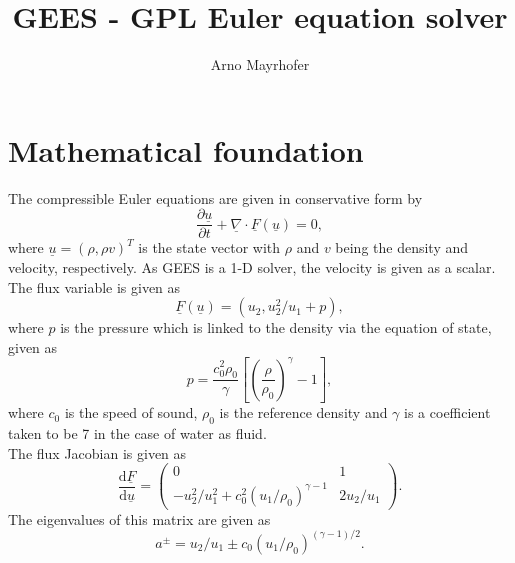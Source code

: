 \documentclass[a4paper]{article}
\newcommand{\uvec}[1]{\underline{#1}}
\newcommand{\unabla}{\uvec{\nabla}}
\newcommand{\td}{\mbox{d}}
\begin{document}
\title{GEES - GPL Euler equation solver}
\author{Arno Mayrhofer}

\maketitle

\section{Mathematical foundation}
The compressible Euler equations are given in conservative form by
\begin{equation}
\frac{\partial \uvec{u}}{\partial t} + \unabla \cdot \uvec{F}(\uvec{u}) = 0,
\label{e:euler}
\end{equation}
where $\uvec{u} = (\rho, \rho v)^T$ is the state vector with $\rho$ and $v$ being the density and velocity, respectively. As GEES is a 1-D solver, the velocity is given as a scalar. The flux variable is given as
\begin{equation}
\uvec{F}(\uvec{u}) = (u_2, u_2^2/u_1 + p),
\label{e:flux}
\end{equation}
where $p$ is the pressure which is linked to the density via the equation of state, given as
\begin{equation}
p = \frac{c_0^2 \rho_0}{\gamma}\left[ \left(\frac{\rho}{\rho_0} \right)^\gamma - 1\right],
\label{e:eos}
\end{equation}
where $c_0$ is the speed of sound, $\rho_0$ is the reference density and $\gamma$ is a coefficient taken to be 7 in the case of water as fluid.
\\
The flux Jacobian is given as
\begin{equation}
\frac{\td \uvec{F}}{\td \uvec{u}} =
\begin{pmatrix}
0 & 1 \\
-u_2^2/u_1^2 + c_0^2 (u_1/\rho_0)^{\gamma-1} & 2 u_2/u_1
\end{pmatrix}.
\label{e:jacobian}
\end{equation}
The eigenvalues of this matrix are given as
\begin{equation}
a^\pm = u_2/u_1 \pm c_0(u_1/\rho_0)^{(\gamma-1)/2}.
\label{e:ev}
\end{equation}
\end{document}
